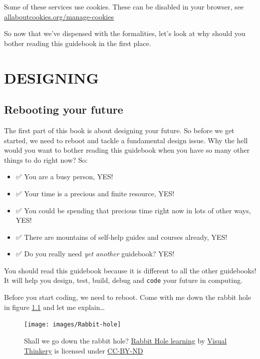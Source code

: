 \documentclass[
]{book}
\providecommand{\tightlist}{%
  \setlength{\itemsep}{0pt}\setlength{\parskip}{0pt}}
\begin{document}
Some of these services use cookies. These can be disabled in your browser, see \href{https://www.allaboutcookies.org/manage-cookies/}{allaboutcookies.org/manage-cookies}

So now that we've dispensed with the formalities, let's look at why should you bother reading this guidebook in the first place.









\hypertarget{part-designing}{%
\part{DESIGNING}\label{part-designing}}

\hypertarget{rebooting}{%
\chapter{Rebooting your future}\label{rebooting}}

The first part of this book is about designing your future. So before we get started, we need to reboot and tackle a fundamental design issue. Why the hell would you want to bother reading this guidebook when you have so many other things to do right now? So:

\begin{itemize}
\tightlist
\item
  ✅ You are a busy person, YES!
\item
  ✅ Your time is a precious and finite resource, YES!
\item
  ✅ You could be spending that precious time right now in lots of other ways, YES!
\item
  ✅ There are mountains of self-help guides and courses already, YES!
\item
  ✅ Do you really need \emph{yet another} guidebook? YES!
\end{itemize}

You should read this guidebook because it is different to all the other guidebooks! It will help you design, test, build, debug and \texttt{code} your future in computing.

Before you start coding, we need to reboot. Come with me down the rabbit hole in figure \ref{fig:rabbit-fig} and let me explain\ldots{} 🐇

\begin{figure}

{\centering \texttt{[image: images/Rabbit-hole]} 

}

\caption{Shall we go down the rabbit hole? \href{https://bryanmmathers.com/rabbit-hole-learning/}{Rabbit Hole learning} by \href{https://visualthinkery.com}{Visual Thinkery} is licensed under \href{https://creativecommons.org/licenses/by-nd/4.0/}{CC-BY-ND}}\label{fig:rabbit-fig}
\end{figure}
\end{document}
